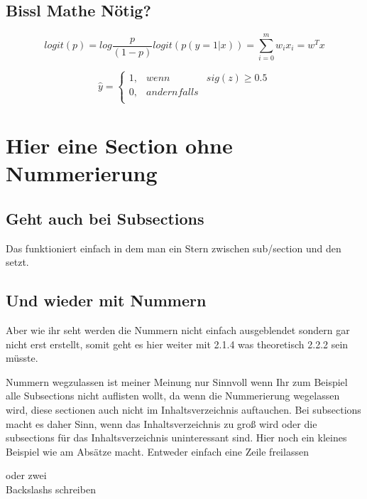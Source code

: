 \subsection{Bissl Mathe Nötig?}

\begin{displaymath}
    logit(p) = log \frac{p}{(1-p)}
    logit(p(y=1|x)) = \sum_{i=0}^{m} w_{i}x_{i} = w^T x 
\end{displaymath}

\begin{displaymath}
    \hat{y} =\left\{%
    \begin{array}{lll}
        1, & wenn & sig(z) \ge 0.5\\
        0, & andernfalls & \\
    \end{array}%
    \right.
\end{displaymath}

\section*{Hier eine Section ohne Nummerierung}

\subsection*{Geht auch bei Subsections}
Das funktioniert einfach in dem man ein Stern zwischen sub/section und den {} setzt.
\subsection{Und wieder mit Nummern}
Aber wie ihr seht werden die Nummern nicht einfach ausgeblendet sondern gar nicht erst erstellt, somit geht es hier weiter mit 2.1.4 was theoretisch 2.2.2 sein müsste.

Nummern wegzulassen ist meiner Meinung nur Sinnvoll wenn Ihr zum Beispiel alle Subsections nicht auflisten wollt, da wenn die Nummerierung wegelassen wird, diese sectionen auch nicht im Inhaltsverzeichnis auftauchen. Bei subsections macht es daher Sinn, wenn das Inhaltsverzeichnis zu groß wird oder die subsections für das Inhaltsverzeichnis uninteressant sind. Hier noch ein kleines Beispiel wie am Absätze macht. Entweder einfach eine Zeile freilassen 

oder zwei \\  Backslashs schreiben 